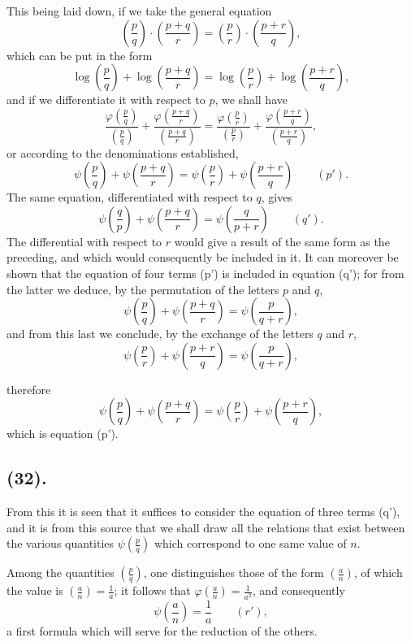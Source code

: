 \documentclass{article}
\begin{document}
This being laid down, if we take the general equation
\[ \left(\frac{p}{q}\right)\cdot\left(\frac{p+q}{r}\right)=\left(\frac{p}{r}\right)\cdot\left(\frac{p+r}{q}\right), \]
which can be put in the form
\[ \log\left(\frac{p}{q}\right)+\log\left(\frac{p+q}{r}\right)=\log\left(\frac{p}{r}\right)+\log\left(\frac{p+r}{q}\right), \]
and if we differentiate it with respect to $p$, we shall have
\[ \frac{\varphi\left(\frac{p}{q}\right)}{\left(\frac{p}{q}\right)}+\frac{\varphi\left(\frac{p+q}{r}\right)}{\left(\frac{p+q}{r}\right)}=\frac{\varphi\left(\frac{p}{r}\right)}{\left(\frac{p}{r}\right)}+\frac{\varphi\left(\frac{p+r}{q}\right)}{\left(\frac{p+r}{q}\right)}, \]
or according to the denominations established,
\[ \psi\left(\frac{p}{q}\right)+\psi\left(\frac{p+q}{r}\right)=\psi\left(\frac{p}{r}\right)+\psi\left(\frac{p+r}{q}\right)\qquad(p'). \]
The same equation, differentiated with respect to $q$, gives
\[ \psi\left(\frac{q}{p}\right)+\psi\left(\frac{p+q}{r}\right)=\psi\left(\frac{q}{p+r}\right)\qquad(q'). \]
The differential with respect to $r$ would give a result of the same form as the preceding, and which would consequently be included in it. It can moreover be shown that the equation of four terms (p') is included in equation (q'); for from the latter we deduce, by the permutation of the letters $p$ and $q$,
\[ \psi\left(\frac{p}{q}\right)+\psi\left(\frac{p+q}{r}\right)=\psi\left(\frac{p}{q+r}\right), \]
and from this last we conclude, by the exchange of the letters $q$ and $r$,
\[ \psi\left(\frac{p}{r}\right)+\psi\left(\frac{p+r}{q}\right)=\psi\left(\frac{p}{q+r}\right), \]

therefore
\[ \psi\left(\frac{p}{q}\right)+\psi\left(\frac{p+q}{r}\right)=\psi\left(\frac{p}{r}\right)+\psi\left(\frac{p+r}{q}\right), \]
which is equation (p').

\subsection*{(32).}

From this it is seen that it suffices to consider the equation of three terms (q'), and it is from this source that we shall draw all the relations that exist between the various quantities $\psi\left(\frac{p}{q}\right)$ which correspond to one same value of $n$.

Among the quantities $\left(\frac{p}{q}\right)$, one distinguishes those of the form $\left(\frac{a}{n}\right)$, of which the value is $\left(\frac{a}{n}\right)=\frac{1}{a}$; it follows that $\varphi\left(\frac{a}{n}\right)=\frac{1}{a^{2}}$, and consequently
\[ \psi\left(\frac{a}{n}\right)=\frac{1}{a}\qquad(r'), \]
a first formula which will serve for the reduction of the others.
\end{document}
